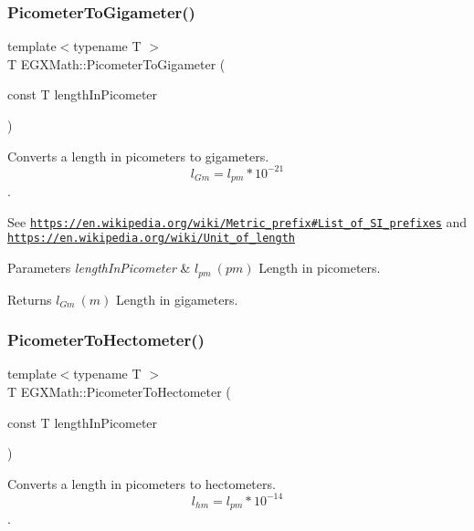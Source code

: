 \subsubsection{\texorpdfstring{Picometer\+To\+Gigameter()}{PicometerToGigameter()}}
{\footnotesize\ttfamily template$<$typename T $>$ \\
T E\+G\+X\+Math\+::\+Picometer\+To\+Gigameter (\begin{DoxyParamCaption}\item[{const T}]{length\+In\+Picometer }\end{DoxyParamCaption})}



Converts a length in picometers to gigameters. \[ l_{Gm}=l_{pm} * 10^{-21} \]. 

See \href{https://en.wikipedia.org/wiki/Metric_prefix#List_of_SI_prefixes}{\tt https\+://en.\+wikipedia.\+org/wiki/\+Metric\+\_\+prefix\#\+List\+\_\+of\+\_\+\+S\+I\+\_\+prefixes} and \href{https://en.wikipedia.org/wiki/Unit_of_length}{\tt https\+://en.\+wikipedia.\+org/wiki/\+Unit\+\_\+of\+\_\+length} 
\begin{DoxyParams}{Parameters}
{\em length\+In\+Picometer} & $ l_{pm}\ (pm)$ Length in picometers. \\
\hline
\end{DoxyParams}
\begin{DoxyReturn}{Returns}
$ l_{Gm}\ (m)$ Length in gigameters. 
\end{DoxyReturn}
\mbox{\label{group___e_g_x_math-_conversions-_length_conversions-_s_i-_picometer-_s_i_ga51eebefd8810385585aa33ca80ac6e93}} 
\subsubsection{\texorpdfstring{Picometer\+To\+Hectometer()}{PicometerToHectometer()}}
{\footnotesize\ttfamily template$<$typename T $>$ \\
T E\+G\+X\+Math\+::\+Picometer\+To\+Hectometer (\begin{DoxyParamCaption}\item[{const T}]{length\+In\+Picometer }\end{DoxyParamCaption})}



Converts a length in picometers to hectometers. \[ l_{hm}=l_{pm} * 10^{-14} \]. 

